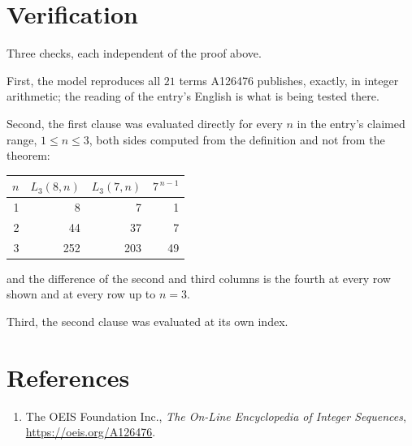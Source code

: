 \documentclass[11pt,a4paper]{article}
\theoremstyle{plain}
\theoremstyle{definition}
\begin{document}
\section{Verification}

Three checks, each independent of the proof above.

First, the model reproduces all $21$ terms A126476 publishes, exactly, in integer
arithmetic; the reading of the entry's English is what is being tested there.

Second, the first clause was evaluated directly for every $n$ in the entry's claimed range,
$1\le n\le3$, both sides computed from the definition and not from the theorem:

\begin{center}
\begin{tabular}{rrrr}
$n$ & $L_{3}(8,n)$ & $L_{3}(7,n)$ & $7^{\,n-1}$ \\ \hline
1 & 8 & 7 & 1 \\
2 & 44 & 37 & 7 \\
3 & 252 & 203 & 49 \\
\end{tabular}
\end{center}

\noindent and the difference of the second and third columns is the fourth at every row shown
and at every row up to $n=3$.

Third, the second clause was evaluated at its own index.

\section*{References}
\begin{enumerate}
\item The OEIS Foundation Inc., \emph{The On-Line Encyclopedia of Integer Sequences},
\url{https://oeis.org/A126476}.
\end{enumerate}
\end{document}
